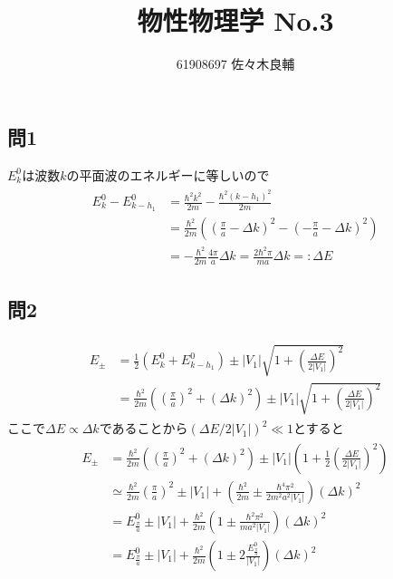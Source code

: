 \documentclass[uplatex,a4j,11pt,dvipdfmx]{jsarticle}
\begin{document}
\title{物性物理学 No.3}
\author{61908697 佐々木良輔}
\date{}
\maketitle
\subsection*{問1}
$E_k^0$は波数$k$の平面波のエネルギーに等しいので
\begin{align}
  \begin{split}
    E_k^0-E_{k-h_1}^0&=\frac{\hbar^2k^2}{2m}-\frac{\hbar^2(k-h_1)^2}{2m}\\
    &=\frac{\hbar^2}{2m}\left(\left(\frac{\pi}{a}-\Delta k\right)^2-\left(-\frac{\pi}{a}-\Delta k\right)^2\right)\\
    &=-\frac{\hbar^2}{2m}\frac{4\pi}{a}\Delta k=\frac{2\hbar^2\pi}{ma}\Delta k=:\Delta E
  \end{split}
\end{align}
\subsection*{問2}
\begin{align}
  \begin{split}
    E_{\pm}&=\frac{1}{2}(E_k^0+E_{k-h_1}^0)\pm |V_1|\sqrt{1+\left(\frac{\Delta E}{2|V_1|}\right)^2}\\
    &=\frac{\hbar^2}{2m}\left(\left(\frac{\pi}{a}\right)^2+\left(\Delta k\right)^2\right)\pm |V_1|\sqrt{1+\left(\frac{\Delta E}{2|V_1|}\right)^2}
  \end{split}
\end{align}
ここで$\Delta E\propto\Delta k$であることから$(\Delta E/2|V_1|)^2\ll 1$とすると
\begin{align}
  \begin{split}
    E_{\pm}&=\frac{\hbar^2}{2m}\left(\left(\frac{\pi}{a}\right)^2+\left(\Delta k\right)^2\right)\pm |V_1|\left(1+\frac{1}{2}\left(\frac{\Delta E}{2|V_1|}\right)^2\right)\\
    &\simeq \frac{\hbar^2}{2m}\left(\frac{\pi}{a}\right)^2\pm |V_1|+\left(\frac{\hbar^2}{2m}\pm\frac{\hbar^4\pi^2}{2m^2a^2|V_1|}\right)(\Delta k)^2\\
    &=E_{\frac{\pi}{a}}^0\pm|V_1|+\frac{\hbar^2}{2m}\left(1\pm\frac{\hbar^2\pi^2}{ma^2|V_1|}\right)(\Delta k)^2\\
    &=E_{\frac{\pi}{a}}^0\pm|V_1|+\frac{\hbar^2}{2m}\left(1\pm 2\frac{E_{\frac{\pi}{a}}^0}{|V_1|}\right)(\Delta k)^2
  \end{split}
\end{align}
\end{document}
